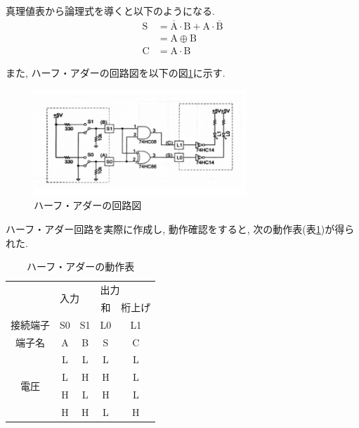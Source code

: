 \documentclass[a4paper, 11pt, uplatex]{jsarticle}
\begin{document}
真理値表から論理式を導くと以下のようになる.
\begin{align}
  \mathrm{S} &= \overline{\mathrm{A}} \cdot \mathrm{B} + \mathrm{A} \cdot \overline{\mathrm{B}} \\ &= \mathrm{A} \oplus \mathrm{B} \\
  \mathrm{C} &= \mathrm{A} \cdot \mathrm{B}
\end{align}

また,  ハーフ・アダーの回路図を以下の図\ref{ハーフアダー}に示す.
\begin{figure}[H]
  \begin{center}
    \includegraphics[width = 8cm]{画像/ハーフアダー.png}
    \caption{ハーフ・アダーの回路図}
    \label{ハーフアダー}
  \end{center}
\end{figure}

ハーフ・アダー回路を実際に作成し,  動作確認をすると,  次の動作表(表\ref{ハーフアダー動作表})が得られた.

\begin{table}[H]
  \begin{center}
  \caption{ハーフ・アダーの動作表}
  \label{ハーフアダー動作表}
\begin{tabular}{|c|c|c|c|c|}
  \hline
                      & \multicolumn{2}{l|}{\multirow{2}{*}{入力}} & \multicolumn{2}{l|}{出力} \\ \cline{4-5}
                      & \multicolumn{2}{l|}{}                    & 和          & 桁上げ        \\ \hline
  接続端子                & S0                  & S1                 & L0         & L1         \\ \hline
  端子名                 & A                   & B                  & S          & C          \\ \hline \hline
  \multirow{4}{*}{電圧} & L                   & L                  & L          & L          \\
                      & L                   & H                  & H          & L          \\
                      & H                   & L                  & H          & L          \\
                      & H                   & H                  & L          & H          \\ \hline
\end{tabular}
\end{center}
\end{table}
\end{document}
